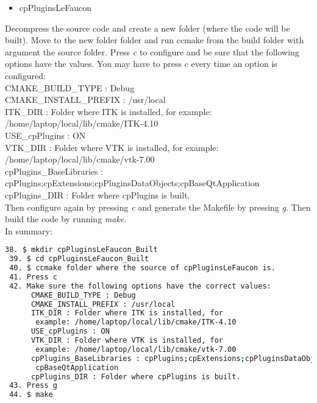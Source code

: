 \documentclass[12pt]{article}
\begin{document}
\begin{itemize}
\item cpPluginsLeFaucon
\end{itemize}
\begin{par}

Decompress the source code and create a new folder (where
the code will be built). Move to the new folder folder and run ccmake from the build folder with argument the
source folder. Press \textit{c} to configure and be sure that the following options have the values. You may have to press c every time an option is configured:\\

\noindent
 CMAKE\_BUILD\_TYPE : Debug\\
 CMAKE\_INSTALL\_PREFIX : /usr/local\\
 ITK\_DIR : Folder where ITK is installed, for example: /home/laptop/local/lib/cmake/ITK-4.10\\
 USE\_cpPlugins : ON\\
 VTK\_DIR : Folder where VTK is installed, for example: /home/laptop/local/lib/cmake/vtk-7.00\\
 cpPlugins\_BaseLibraries : cpPlugins;cpExtensions;cpPluginsDataObjects;cpBaseQtApplication\\
 cpPlugins\_DIR : Folder where cpPlugins is built.\\

Then configure again by pressing \textit{c} and generate the Makefile by pressing \textit{g}.
Then build the code by running \textit{make}.\\

In summary:\\

\noindent
\small
\begin{lstlisting}[language=bash]
 38. $ mkdir cpPluginsLeFaucon_Built
 39. $ cd cpPluginsLeFaucon_Built
 40. $ ccmake folder where the source of cpPluginsLeFaucon is.
 41. Press c 
 42. Make sure the following options have the correct values:
      CMAKE_BUILD_TYPE : Debug
      CMAKE_INSTALL_PREFIX : /usr/local
      ITK_DIR : Folder where ITK is installed, for 
       example: /home/laptop/local/lib/cmake/ITK-4.10
      USE_cpPlugins : ON
      VTK_DIR : Folder where VTK is installed, for 
       example: /home/laptop/local/lib/cmake/vtk-7.00
      cpPlugins_BaseLibraries : cpPlugins;cpExtensions;cpPluginsDataObjects;
       cpBaseQtApplication
      cpPlugins_DIR : Folder where cpPlugins is built.
 43. Press g
 44. $ make
 
\end{lstlisting}

\end{par}
\normalsize
\end{document}
